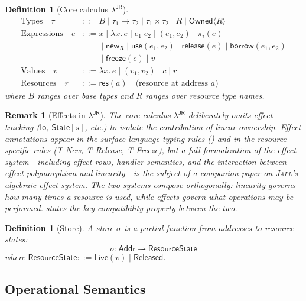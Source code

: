 \documentclass[11pt]{article}
\newtheorem{definition}[theorem]{Definition}
\newtheorem{remark}[theorem]{Remark}
\newcommand{\JAPL}{\textsc{Japl}}
\newcommand{\Owned}[1]{\mathsf{Owned}\langle #1 \rangle}
\newcommand{\Io}{\mathsf{Io}}
\begin{document}
\begin{definition}[Core calculus $\lambda^{\mathsf{JR}}$]\label{def:core-calculus}
\begin{align*}
  \text{Types}\quad \tau &::= B \mid \tau_1 \to \tau_2 \mid \tau_1 \times \tau_2
    \mid R \mid \Owned{R} \\
  \text{Expressions}\quad e &::= x \mid \lambda x.\, e \mid e_1\; e_2
    \mid (e_1, e_2) \mid \pi_i(e) \\
    &\phantom{::=} \mid \mathsf{new}_R \mid \mathsf{use}(e_1, e_2) \mid
      \mathsf{release}(e) \mid \mathsf{borrow}(e_1, e_2) \\
    &\phantom{::=} \mid \mathsf{freeze}(e) \mid v \\
  \text{Values}\quad v &::= \lambda x.\, e \mid (v_1, v_2) \mid c \mid r \\
  \text{Resources}\quad r &::= \mathsf{res}(a) \quad\text{(resource at address $a$)}
\end{align*}
where $B$ ranges over base types and $R$ ranges over resource type names.
\end{definition}

\begin{remark}[Effects in $\lambda^{\mathsf{JR}}$]\label{rem:effects-orthogonal}
The core calculus $\lambda^{\mathsf{JR}}$ deliberately omits effect
tracking ($\Io$, $\mathsf{State}[s]$, etc.) to isolate the
contribution of linear ownership.  Effect annotations appear in the
surface-language typing rules () and in the
resource-specific rules (T-New, T-Release, T-Freeze), but a full
formalization of the effect system---including effect rows, handler
semantics, and the interaction between effect polymorphism and
linearity---is the subject of a companion paper on \JAPL{}'s
algebraic effect system.  The two systems compose orthogonally:
linearity governs \emph{how many times} a resource is used, while
effects govern \emph{what operations} may be performed.
 states the key compatibility property
between the two.
\end{remark}

\begin{definition}[Store]\label{def:store}
A \emph{store} $\sigma$ is a partial function from addresses to resource
states:
\[
  \sigma : \mathsf{Addr} \rightharpoonup \mathsf{ResourceState}
\]
where $\mathsf{ResourceState} ::= \mathsf{Live}(v) \mid \mathsf{Released}$.
\end{definition}

\subsection{Operational Semantics}
\end{document}
